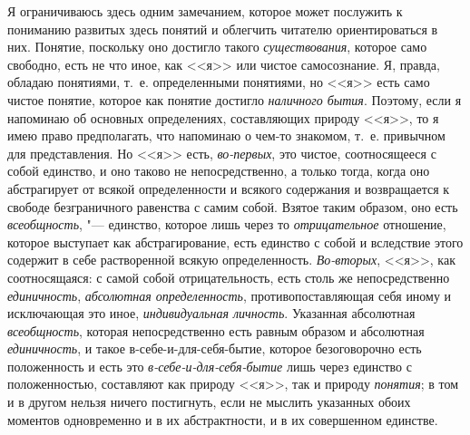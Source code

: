 {Я ограничиваюсь здесь одним замечанием, которое может послужить к пониманию
развитых здесь понятий и облегчить читателю ориентироваться в них. Понятие,
поскольку оно достигло такого {\em существования}, которое само свободно,
есть не что иное, как <<я>> или чистое самосознание. Я, правда, обладаю
понятиями, т.~е. определенными понятиями, но <<я>> есть само чистое понятие,
которое как понятие достигло {\em наличного бытия}. Поэтому, если я напоминаю
об основных определениях, составляющих природу <<я>>, то я имею право
предполагать, что напоминаю о чем-то знакомом, т.~е. привычном для
представления. Но <<я>> есть, {\em во-первых}, это чистое, соотносящееся с собой
единство, и оно таково не непосредственно, а только тогда, когда оно
абстрагирует от всякой определенности и всякого содержания и возвращается к
свободе безграничного равенства с самим собой. Взятое таким образом, оно
есть {\em всеобщность}, "--- единство, которое лишь через то {\em отрицательное}
отношение, которое выступает как абстрагирование, есть единство с собой и
вследствие этого содержит в себе растворенной всякую определенность. {\em Во-вторых},
<<я>>, как соотносящаяся: с самой собой отрицательность, есть столь же
непосредственно {\em единичность}, {\em абсолютная определенность},
противопоставляющая себя иному и исключающая это иное, {\em индивидуальная личность}.
Указанная абсолютная {\em всеобщность}, которая непосредственно есть равным
образом и абсолютная {\em единичность}, и такое в-себе-и-для-себя-бытие,
которое безоговорочно есть положенность и есть это {\em в-себе-и-для-себя-бытие}
лишь через единство с положенностью, составляют как природу <<я>>, так и
природу {\em понятия}; в том и в другом нельзя ничего постигнуть, если не
мыслить указанных обоих моментов одновременно и в их абстрактности, и в их
совершенном единстве.

}
